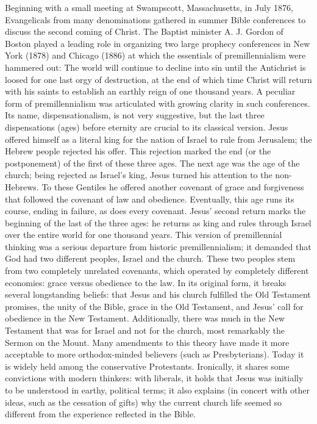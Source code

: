 Beginning with a small meeting at Swampscott, Massachusetts, in July 1876, Evangelicals from many
denominations gathered in summer Bible conferences to discuss the second coming of Christ. The
Baptist minister A. J. Gordon of Boston played a leading role in organizing two large prophecy
conferences in New York (1878) and Chicago (1886) at which the essentials of premillennialism were
hammered out: The world will continue to decline into sin until the Antichrist is loosed for one
last orgy of destruction, at the end of which time Christ will return with his saints to establish
an earthly reign of one thousand years. A peculiar form of premillennialism was articulated with
growing clarity in such conferences. Its name, dispensationalism, is not very suggestive, but the
last three dispensations (ages) before eternity are crucial to its classical version. Jesus offered
himself as a literal king for the nation of Israel to rule from Jerusalem; the Hebrew people
rejected his offer. This rejection marked the end (or the postponement) of the first of these three
ages. The next age was the age of the church; being rejected as Israel’s king, Jesus turned his
attention to the non-Hebrews. To these Gentiles he offered another covenant of grace and forgiveness
that followed the covenant of law and obedience. Eventually, this age runs its course, ending in
failure, as does every covenant. Jesus’ second return marks the beginning of the last of the three
ages: he returns as king and rules through Israel over the entire world for one thousand years. This
version of premillennial thinking was a serious departure from historic premillennialism; it
demanded that God had two different peoples, Israel and the church. These two peoples stem from two
completely unrelated covenants, which operated by completely different economies: grace versus
obedience to the law. In its original form, it breaks several longstanding beliefs: that Jesus and
his church fulfilled the Old Testament promises, the unity of the Bible, grace in the Old Testament,
and Jesus’ call for obedience in the New Testament. Additionally, there was much in the New
Testament that was for Israel and not for the church, most remarkably the Sermon on the Mount. Many
amendments to this theory have made it more acceptable to more orthodox-minded believers (such as
Presbyterians). Today it is widely held among the conservative Protestants. Ironically, it shares
some convictions with modern thinkers: with liberals, it holds that Jesus was initially to be
understood in earthy, political terms; it also explains (in concert with other ideas, such as the
cessation of gifts) why the current church life seemed so different from the experience reflected in
the Bible.

